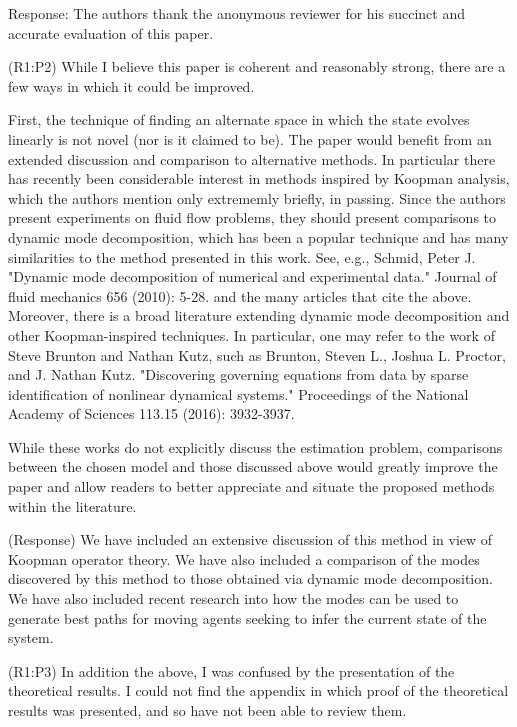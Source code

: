\documentclass{letter}
\begin{document}
{\color{red} Response:} The authors thank the anonymous reviewer for his succinct and accurate evaluation of this paper.


{\color{red}(R1:P2)} While I believe this paper is coherent and reasonably strong, there are
a few ways in which it could be improved. 

First, the technique of finding an alternate space in which the state
evolves linearly is not novel (nor is it claimed to be). The paper
would benefit from an extended discussion and comparison to alternative
methods. In particular there has recently been considerable interest in
methods inspired by Koopman analysis, which the authors mention only
extrememly briefly, in passing. Since the authors present experiments
on fluid flow problems, they should present comparisons to dynamic mode
decomposition, which has been a popular technique and has many
similarities to the method presented in this work. See, e.g.,
Schmid, Peter J. "Dynamic mode decomposition of numerical and
experimental data." Journal of fluid mechanics 656 (2010): 5-28.
and the many articles that cite the above. Moreover, there is a broad
literature extending dynamic mode decomposition and other
Koopman-inspired techniques. In particular, one may refer to the work
of Steve Brunton and Nathan Kutz, such as 
Brunton, Steven L., Joshua L. Proctor, and J. Nathan Kutz. "Discovering
governing equations from data by sparse identification of nonlinear
dynamical systems." Proceedings of the National Academy of Sciences
113.15 (2016): 3932-3937.

While these works do not explicitly discuss the estimation problem,
comparisons between the chosen model and those discussed above would
greatly improve the paper and allow readers to better appreciate and
situate the proposed methods within the literature. 

{\color{red}(Response)} We have included an extensive discussion of this method in view of Koopman operator theory. We have also included a comparison of the modes discovered by this method to those obtained via dynamic mode decomposition. We have also included recent research into how the modes can be used to generate best paths for moving agents seeking to infer the current state of the system.

{\color{red}(R1:P3)} In addition the above, I was confused by the presentation of the
theoretical results. I could not find the appendix in which proof of
the theoretical results was presented, and so have not been able to
review them. 
\end{document}

